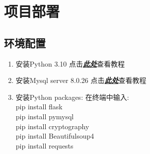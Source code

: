 \documentclass[twoside,11pt]{article}
\begin{document}
\section{项目部署}
\subsection{环境配置}
\begin{enumerate}
    \item 安装Python 3.10 点击\href{https://zhuanlan.zhihu.com/p/273378438}{\textbf{\emph{此处}}}查看教程
    \item 安装Mysql server 8.0.26 点击\href{https://zhuanlan.zhihu.com/p/188416607}{\textbf{\emph{此处}}}查看教程
    \item 安装Python packages: 在终端中输入:\\
          pip install flask\\
          pip install pymysql\\
          pip install cryptography\\
          pip install Beautifulsoup4\\
          pip install requests\\

\end{enumerate}
\end{document}

